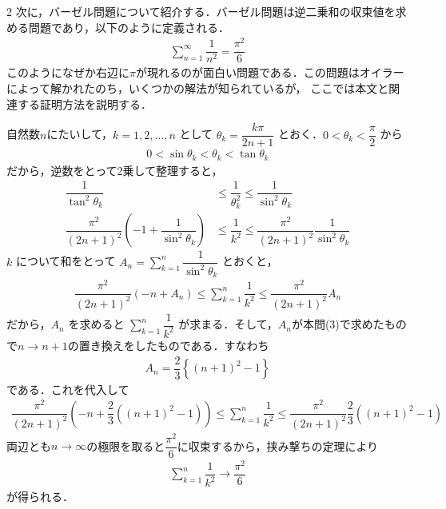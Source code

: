 \documentclass[../../main.tex]{subfiles}
\begin{document}
\begin{multicols}{2}
  次に，バーゼル問題について紹介する．バーゼル問題は逆二乗和の収束値を求める問題であり，以下のように定義される．
  \begin{align}
    \sum_{n=1}^{\infty} \dfrac{1}{n^2} = \dfrac{\pi^2}{6}
  \end{align}
  このようになぜか右辺に$\pi$が現れるのが面白い問題である．この問題はオイラーによって解かれたのち，いくつかの解法が知られているが，
  ここでは本文と関連する証明方法を説明する．

  自然数$n$にたいして，$k=1,2,\dots,n$ として $\theta_k = \dfrac{k\pi}{2n+1}$ とおく．$0 < \theta_k < \dfrac{\pi}{2}$ から
  \begin{align}
    0 < \sin\theta_k < \theta_k < \tan\theta_k
  \end{align}
  だから，逆数をとって2乗して整理すると，
  \begin{align}
    \dfrac{1}{\tan^2\theta_k}                                          & \le \dfrac{1}{\theta_k^2} \le \dfrac{1}{\sin^2\theta_k}                 \\
    \dfrac{\pi^2}{(2n+1)^2} \left(-1 + \dfrac{1}{\sin^2\theta_k}\right) & \le \dfrac{1}{k^2} \le \dfrac{\pi^2}{(2n+1)^2} \dfrac{1}{\sin^2\theta_k}
  \end{align}
  $k$ について和をとって $\displaystyle A_n = \sum_{k=1}^n \dfrac{1}{\sin^2\theta_k}$ とおくと，
  \begin{align}
    \dfrac{\pi^2}{(2n+1)^2} \left(-n + A_n\right) \le \sum_{k=1}^n \dfrac{1}{k^2} \le \dfrac{\pi^2}{(2n+1)^2} A_n
  \end{align}
  だから，$A_n$ を求めると $\displaystyle \sum_{k=1}^n \dfrac{1}{k^2}$ が求まる．そして，$A_n$が本問(3)で求めたもので$n\to n+1$の置き換えをしたものである．すなわち
  \begin{align}
    A_n = \dfrac{2}{3}\left\{(n+1)^2-1\right\}
  \end{align}
  である．これを代入して
  \begin{align}
    \dfrac{\pi^2}{(2n+1)^2} \left(-n + \dfrac{2}{3}((n+1)^2-1)\right) \le \sum_{k=1}^n \dfrac{1}{k^2} \le \dfrac{\pi^2}{(2n+1)^2} \dfrac{2}{3}((n+1)^2-1)
  \end{align}
  両辺とも$n\to\infty$の極限を取ると$\dfrac{\pi^2}{6}$に収束するから，挟み撃ちの定理により
  \begin{align}
    \sum_{k=1}^n \dfrac{1}{k^2} \longrightarrow \dfrac{\pi^2}{6}
  \end{align}
  が得られる．

  \newpage
\end{multicols}
\end{document}
